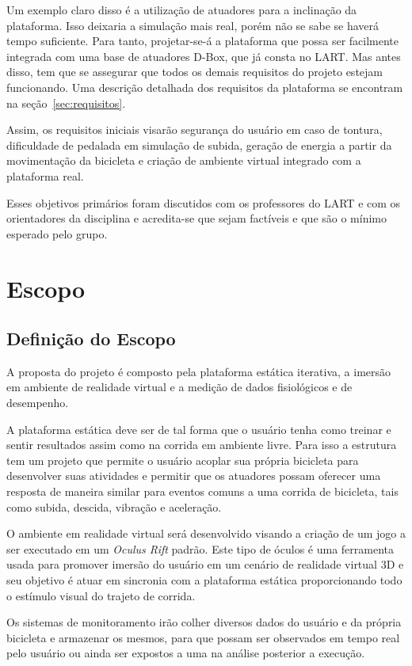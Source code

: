 	Um exemplo claro disso é a utilização de atuadores para a inclinação da plataforma. Isso deixaria a simulação mais real, porém não se sabe se haverá tempo suficiente. Para tanto, projetar-se-á a plataforma que possa ser facilmente integrada com uma base de atuadores D-Box, que já consta no LART. Mas antes disso, tem que se assegurar que todos os demais requisitos do projeto estejam funcionando. Uma descrição detalhada dos requisitos da plataforma se encontram na seção~\ref{sec:requisitos}.

	Assim, os requisitos iniciais visarão segurança do usuário em caso de tontura, dificuldade de pedalada em simulação de subida, geração de energia a partir da movimentação da bicicleta e criação de ambiente virtual integrado com a plataforma real.

	Esses objetivos primários foram discutidos com os professores do LART e com os orientadores da disciplina e acredita-se que sejam factíveis e que são o mínimo esperado pelo grupo.


\section{Escopo}
\subsection{Definição do Escopo}

A proposta do projeto é composto pela plataforma estática iterativa, a imersão em ambiente de realidade virtual e a medição de dados fisiológicos e de desempenho.

A plataforma estática deve ser de tal forma que o usuário tenha como treinar e sentir resultados assim como na corrida em ambiente livre. Para isso a estrutura tem um projeto que permite o usuário acoplar sua própria bicicleta para desenvolver suas atividades e permitir que os atuadores possam oferecer uma resposta de maneira similar para eventos comuns a uma corrida de bicicleta, tais como subida, descida, vibração e aceleração.

O ambiente em realidade virtual será desenvolvido visando a criação de um jogo a ser executado em um \textit{Oculus Rift} padrão. Este tipo de óculos é uma ferramenta usada para promover imersão do usuário em um cenário de realidade virtual 3D e seu objetivo é atuar em sincronia com a plataforma estática proporcionando todo o estímulo visual do trajeto de corrida.

Os sistemas de monitoramento irão colher diversos dados do usuário e da própria bicicleta e armazenar os mesmos, para que possam ser observados em tempo real pelo usuário ou ainda ser expostos a uma na análise posterior a execução.

